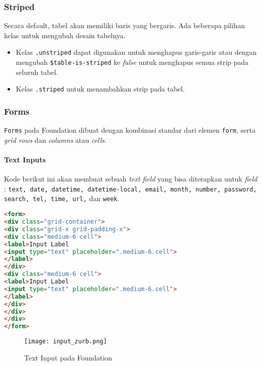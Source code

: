 \subsubsection{Striped}
Secara default, tabel akan memiliki baris yang bergaris. 
Ada beberapa pilihan kelas untuk mengubah desain tabelnya.
\begin{itemize}
	\item Kelas \texttt{.unstriped} dapat digunakan untuk menghapus garis-garis atau dengan mengubah \verb|$table-is-striped| ke \textit{false} untuk menghapus semua strip pada seluruh tabel.
	\item Kelas \texttt{.striped} untuk menambahkan strip pada tabel.	
\end{itemize}

\subsubsection{Forms}
\texttt{Forms} pada Foundation dibuat dengan kombinasi standar dari elemen \texttt{form}, serta \textit{grid rows} dan \textit{columns} atau \textit{cells}. 

\paragraph{Text Inputs}
Kode berikut ini akan membuat sebuah \textit{text field} yang bisa diterapkan untuk \textit{field} : \texttt{text, date, datetime, datetime-local, email, month, number, password, search, tel, time, url,} dan \texttt{week}.

\begin{lstlisting}[language=HTML,  basicstyle=\ttfamily, frame=single, columns=fullflexible, keepspaces=true, breaklines=true, showstringspaces=false, label={lst:textinputsFoundation}, caption=Text inputs pada foundation 6.] 
<form>
<div class="grid-container">
<div class="grid-x grid-padding-x">
<div class="medium-6 cell">
<label>Input Label
<input type="text" placeholder=".medium-6.cell">
</label>
</div>
<div class="medium-6 cell">
<label>Input Label
<input type="text" placeholder=".medium-6.cell">
</label>
</div>
</div>
</div>
</form>
\end{lstlisting}

\begin{figure} [H]
	\centering  
	\texttt{[image: input\_zurb.png]}  
	\caption{Text Input pada Foundation}
	\label{fig:gridbasicZurb} 
\end{figure}

